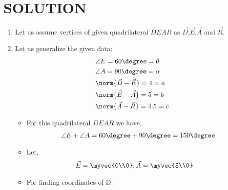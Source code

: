 \documentclass[journal,12pt,twocolumn]{IEEEtran}
\begin{document}
\section{SOLUTION}
\begin{enumerate}
\item Let us assume vertices of given quadrilateral $DEAR$ as $\vec{D}$,$\vec{E}$,$\vec{A}$ and $\vec{R}$.
\item Let us generalize the given data:
    \begin{align}
    &\angle E= 60\degree=\theta \label{eq1}
    \\
    &\angle A= 90\degree=\alpha \label{eq2}
    \\
    &\norm{\vec{D}-\vec{E}} =4=a \label{eq3}
    \\
    &\norm{\vec{E}-\vec{A}} =5=b \label{eq4}
    \\
     &\norm{\vec{A}-\vec{R}} =4.5=c \label{eq5}
    \end{align}
\begin{itemize}
\item For this quadrilateral $DEAR$ we have,
\begin{align}
\angle E +\angle A = 60\degree + 90\degree =150\degree
\end{align}
\item Let, \begin{align}
    &\vec{E}=\myvec{0\\0}, \vec{A}=\myvec{5\\0}
\end{align}
\end{itemize}
\begin{itemize}
\item For finding coordinates of D:-

\end{itemize}
\end{enumerate}
\end{document}
